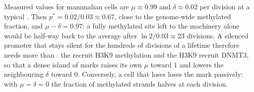 \begin{example}[Numbers]\label{ex:b3:chromatin-epigenetics:maintenance-numbers}
Measured values for mammalian cells are $\mu \approx 0.99$ and
$\delta \approx 0.02$ per division at a typical . Then $p^{*} =
0.02/0.03 \approx 0.67$, close to the genome-wide methylated fraction,
and $\mu - \delta = 0.97$: a fully methylated site left to the
machinery alone would be half-way back to the average after $\ln 2 /
0.03 \approx 23$ divisions. A silenced promoter that stays silent for
the hundreds of divisions of a lifetime therefore needs more than
: the   recruit H3K9 methylation and the H3K9
 recruit DNMT3, so that a dense island of marks raises its own
$\mu$ toward $1$ and lowers the neighbouring $\delta$ toward $0$.
Conversely, a cell that loses  loses the mark passively: with
$\mu = \delta = 0$ the fraction of methylated strands halves at each
division.
\end{example}

